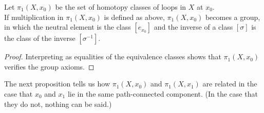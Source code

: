 \documentclass[12pt]{article}
\begin{document}
\begin{thm}
	Let $\pi_1(X, x_0)$ be the set of homotopy classes of loops in $X$ at $x_0.$\\
	If multiplication in $\pi_1(X, x_0)$ is defined as above, $\pi_1(X, x_0)$ becomes a group, in which the neutral element is the class $[e_{x_0}]$ and the inverse of a class $[\sigma]$ is the class of the inverse $[\sigma^{-1}].$
\end{thm}
\begin{proof} 
	Interpreting  as equalities of the equivalence classes shows that $\pi_1(X, x_0)$ verifies the group axioms.
\end{proof}

The next proposition tells us how $\pi_1(X, x_0)$ and $\pi_1(X, x_1)$ are related in the case that $x_0$ and $x_1$ lie in the same path-connected component. (In the case that they do not, nothing can be said.)
\end{document}
